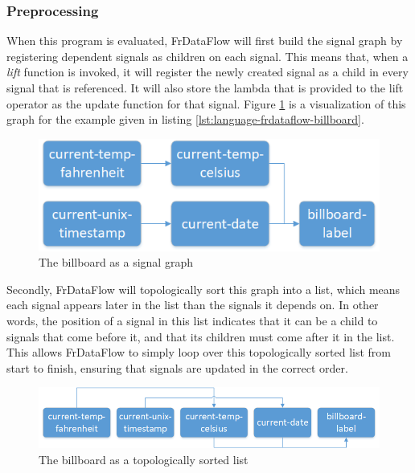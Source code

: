 \subsubsection{Preprocessing}

When this program is evaluated, FrDataFlow will first build the signal graph by registering dependent signals as children on each signal. This means that, when a \textit{lift} function is invoked, it will register the newly created signal as a child in every signal that is referenced. It will also store the lambda that is provided to the lift operator as the update function for that signal. Figure \ref{fig:language-frdataflow-example} is a visualization of this graph for the example given in listing \ref{lst:language-frdataflow-billboard}.

\begin{figure}[h]
	\centerline{\includegraphics[width=\textwidth]{images/Language-FrDataflow-Example.png}}
	\caption{The billboard as a signal graph}
	\label{fig:language-frdataflow-example}
\end{figure}

Secondly, FrDataFlow will topologically sort this graph into a list, which means each signal appears later in the list than the signals it depends on. In other words, the position of a signal in this list indicates that it can be a child to signals that come before it, and that its children must come after it in the list. This allows FrDataFlow to simply loop over this topologically sorted list from start to finish, ensuring that signals are updated in the correct order. 

\begin{figure}[h]
	\centerline{\includegraphics[width=\textwidth]{images/Language-FrDataflow-TopologicallySortedList.png}}
	\caption{The billboard as a topologically sorted list}
	\label{fig:language-frdataflow-topologically-sorted-list}
\end{figure}

